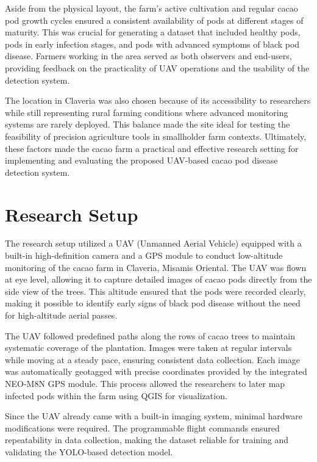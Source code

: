 	Aside from the physical layout, the farm’s active cultivation and regular cacao pod growth cycles ensured a consistent availability of pods at different stages of maturity. 
	This was crucial for generating a dataset that included healthy pods, pods in early infection stages, and pods with advanced symptoms of black pod disease. 
	Farmers working in the area served as both observers and end-users, providing feedback on the practicality of UAV operations and the usability of the detection system.  
	
	The location in Claveria was also chosen because of its accessibility to researchers while still representing rural farming conditions where advanced monitoring systems are rarely deployed. 
	This balance made the site ideal for testing the feasibility of precision agriculture tools in smallholder farm contexts. 
	Ultimately, these factors made the cacao farm a practical and effective research setting for implementing and evaluating the proposed UAV-based cacao pod disease detection system.  
	
	\section{Research Setup}
	
	The research setup utilized a UAV (Unmanned Aerial Vehicle) equipped with a built-in high-definition camera and a GPS module to conduct low-altitude monitoring of the cacao farm in Claveria, Misamis Oriental. 
	The UAV was flown at eye level, allowing it to capture detailed images of cacao pods directly from the side view of the trees. 
	This altitude ensured that the pods were recorded clearly, making it possible to identify early signs of black pod disease without the need for high-altitude aerial passes.  
	
	The UAV followed predefined paths along the rows of cacao trees to maintain systematic coverage of the plantation. 
	Images were taken at regular intervals while moving at a steady pace, ensuring consistent data collection. 
	Each image was automatically geotagged with precise coordinates provided by the integrated NEO-M8N GPS module. 
	This process allowed the researchers to later map infected pods within the farm using QGIS for visualization.  
	
	Since the UAV already came with a built-in imaging system, minimal hardware modifications were required. 
	The programmable flight commands ensured repeatability in data collection, making the dataset reliable for training and validating the YOLO-based detection model.  
	
